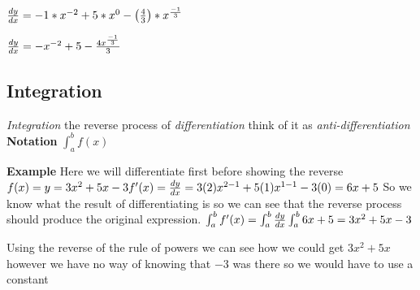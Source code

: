 \documentclass{article}
\begin{document}
$\frac{dy}{dx} = -1*x^{-2} +5*x^{0} -  \left(\frac{4}{3}\right) * x^{\frac{-1}{3}}  \\
$

$\frac{dy}{dx} = -x^{-2} + 5 -  \frac{4x^{\frac{-1}{3}}}{3}  \\
$

\newpage
\subsection{Integration}
\textit{Integration} the reverse process of \textit{differentiation} think of it as \textit{anti-differentiation}
\textbf{Notation}
$ \int_a^b f(x) $


\textbf{Example}
Here we will differentiate first before showing the reverse
$ f(x) = y = 3x^{2} + 5x - 3\\
f'(x) = \frac{dy}{dx} = 3(2)x^{2-1} + 5(1)x^{1-1} - 3(0) = 6x + 5 $
So we know what the result of differentiating is so we can see that the reverse process should produce the original expression.
$
\int_a^b f'(x) =   \int_a^b \frac{dy}{dx}\\
\int_a^b 6x + 5 = 3x^{2} + 5x - 3\\
$

Using the reverse of the rule of powers we can see how we could get  $3x^{2} + 5x $ however we have no way of knowing that $-3$ was there so we would have to use a constant 
\end{document}
